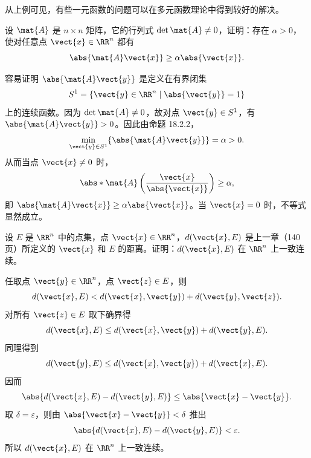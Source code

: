从上例可见，有些一元函数的问题可以在多元函数理论中得到较好的解决。

\begin{xexample}[18.2.6]
设 $\mat{A}$ 是 $n\times n$ 矩阵，它的行列式 $\det\mat{A}\ne0$，证明：存在 $\alpha>0$，使对任意点 $\vect{x}\in\RR^n$ 都有
\[
  \abs{\mat{A}\vect{x}}\ge\alpha\abs{\vect{x}}.
\]
\end{xexample}
\begin{xproof}
容易证明 $\abs{\mat{A}\vect{y}}$ 是定义在有界闭集
\[
  S^1=\{\vect{y}\in\RR^n\mid\abs{\vect{y}}=1\}
\]
上的连续函数。因为 $\det\mat{A}\ne0$，故对点 $\vect{y}\in S^1$，有 $\abs{\mat{A}\vect{y}}>0$。因此由命题 18.2.2，
\[
  \min_{\vect{y}\in S^1}\{\abs{\mat{A}\vect{y}}\}=\alpha>0.
\]
从而当点 $\vect{x}\ne0$ 时，
\[
  \abs*{\mat{A}\left(\frac{\vect{x}}{\abs{\vect{x}}}\right)}\ge\alpha,
\]
即 $\abs{\mat{A}\vect{x}}\ge\alpha\abs{\vect{x}}$。当 $\vect{x}=0$ 时，不等式显然成立。
\end{xproof}

\begin{xexample}[18.2.7]
设 $E$ 是 $\RR^n$ 中的点集，点 $\vect{x}\in\RR^n$，$d(\vect{x},E)$ 是上一章（140 页）所定义的 $\vect{x}$ 和 $E$ 的距离。证明：$d(\vect{x},E)$ 在 $\RR^n$ 上一致连续。
\end{xexample}
\begin{xproof}
任取点 $\vect{y}\in\RR^n$，点 $\vect{z}\in E$，则
\[
  d(\vect{x},E)<d(\vect{x},\vect{y})+d(\vect{y},\vect{z}).
\]
对所有 $\vect{z}\in E$ 取下确界得
\[
  d(\vect{x},E)\le d(\vect{x},\vect{y})+d(\vect{y},E).
\]
同理得到
\[
  d(\vect{y},E)\le d(\vect{x},\vect{y})+d(\vect{x},E).
\]
因而
\[
  \abs{d(\vect{x},E)-d(\vect{y},E)}\le\abs{\vect{x}-\vect{y}}.
\]
取 $\delta=\varepsilon$，则由 $\abs{\vect{x}-\vect{y}}<\delta$ 推出
\[
  \abs{d(\vect{x},E)-d(\vect{y},E)}<\varepsilon.
\]
所以 $d(\vect{x},E)$ 在 $\RR^n$ 上一致连续。
\end{xproof}

